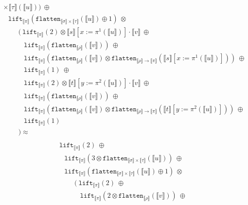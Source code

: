 \documentclass[a4paper,UKenglish,cleveref,autoref,numberwithinsect]{lipics-v2019}
\theoremstyle{definition}
\newcommand{\arrtype}{\rightarrow}
\newcommand{\flatten}{\mathtt{flatten}}
\newcommand{\lift}{\mathtt{lift}}
\newcommand{\typeinterpret}[1]{\llbracket #1 \rrbracket}
\newcommand{\interpret}[1]{\llbracket #1 \rrbracket}
\begin{document}
\begin{itemize}
\[\begin{array}{l}
{    \times \typeinterpret{\tau}}(\interpret{u}))\ \oplus \\
  \phantom{A}
  \lift_{\typeinterpret{\pi}}(\flatten_{\typeinterpret{\sigma} \times
    \typeinterpret{\tau}}(\interpret{u}) \oplus 1)\ \otimes \\
  \phantom{ABC}
  (\ \lift_{\typeinterpret{\pi}}(2) \otimes \interpret{s}[x:=\pi^1(
    \interpret{u})] \cdot \interpret{v}\ \oplus \\
  \phantom{ABCD}
  \lift_{\typeinterpret{\pi}}(\flatten_{
    \typeinterpret{\rho}}(\interpret{v}))\ \oplus \\
  \phantom{ABCD}
  \lift_{\typeinterpret{\pi}}(
    \flatten_{\typeinterpret{\rho}}(\interpret{v}) \otimes
    \flatten_{\typeinterpret{\rho} \arrtype \typeinterpret{\pi}}(
    \interpret{s}[x:=\pi^1(\interpret{u})]))\ \oplus \\
  \phantom{ABCD}
  \lift_{\typeinterpret{\pi}}(1)\ \oplus \\
  \phantom{ABCD}
  \lift_{\typeinterpret{\pi}}(2) \otimes \interpret{t}[y:=\pi^2(
    \interpret{u})] \cdot \interpret{v}\ \oplus \\
  \phantom{ABCD}
  \lift_{\typeinterpret{\pi}}(
    \flatten_{\typeinterpret{\rho}}(\interpret{v}))\ \oplus \\
  \phantom{ABCD}
  \lift_{\typeinterpret{\pi}}(
    \flatten_{\typeinterpret{\rho}}(\interpret{v}) \otimes
    \flatten_{\typeinterpret{\rho} \arrtype
    \typeinterpret{\pi}}(\interpret{t}[y:=\pi^2(\interpret{u})]))\
    \oplus\\
  \phantom{ABCD}
  \lift_{\typeinterpret{\pi}}(1) \\
  \phantom{ABC}) \approx \\
  \end{array}
  \]
  \[
  \begin{array}{l}
  \lift_{\typeinterpret{\pi}}(2)\ \oplus \\
  \phantom{A}
  \lift_{\typeinterpret{\pi}}(3 \otimes \flatten_{\typeinterpret{\sigma}
    \times \typeinterpret{\tau}}(\interpret{u}))\ \oplus \\
  \phantom{A}
  \lift_{\typeinterpret{\pi}}(\flatten_{\typeinterpret{\sigma} \times
    \typeinterpret{\tau}}(\interpret{u}) \oplus 1)\ \otimes \\
  \phantom{ABC}
  (\ \lift_{\typeinterpret{\pi}}(2)\ \oplus \\
  \phantom{ABCD}
  \lift_{\typeinterpret{\pi}}(2 \otimes \flatten_{
    \typeinterpret{\rho}}(\interpret{v}))\ \oplus \\
  \phantom{ABCD}

\end{array}\]
\end{itemize}
\end{document}
